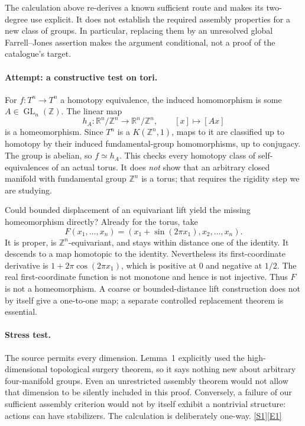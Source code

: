 \documentclass[11pt,a4paper]{article}
\newcommand{\Z}{\mathbb{Z}}
\newcommand{\R}{\mathbb{R}}
\newcommand{\sref}[2]{\hyperlink{source:#1:#2}{[S#2]}}
\newcommand{\eref}[2]{\hyperlink{extra:#1:#2}{[E#2]}}
\numberwithin{equation}{section}
\begin{document}
The calculation above re-derives a known sufficient route and makes its
two-degree use explicit. It does not establish the required assembly
properties for a new class of groups. In particular, replacing them by
an unresolved global Farrell--Jones assertion makes the argument
conditional, not a proof of the catalogue's target.

\paragraph{Attempt: a constructive test on tori.}
For $f:T^n\to T^n$ a homotopy equivalence, the induced homomorphism is
some $A\in\operatorname{GL}_n(\Z)$. The linear map
\[
 h_A:\R^n/\Z^n\longrightarrow\R^n/\Z^n,
 \qquad [x]\longmapsto[Ax]
\]
is a homeomorphism. Since $T^n$ is a $K(\Z^n,1)$, maps to it are
classified up to homotopy by their induced fundamental-group homomorphisms,
up to conjugacy. The group is abelian, so $f\simeq h_A$.
This checks every homotopy class of self-equivalences of an actual torus.
It does \emph{not} show that an arbitrary closed manifold with fundamental
group $\Z^n$ is a torus; that requires the rigidity step we are studying.

Could bounded displacement of an equivariant lift yield the missing
homeomorphism directly? Already for the torus, take
\[
 F(x_1,\ldots,x_n)=
 (x_1+\sin(2\pi x_1),x_2,\ldots,x_n).
\]
It is proper, is $\Z^n$-equivariant, and stays within distance one of the
identity. It descends to a map homotopic to the identity. Nevertheless its
first-coordinate derivative is $1+2\pi\cos(2\pi x_1)$, which is positive
at $0$ and negative at $1/2$. The real first-coordinate function is not
monotone and hence is not injective. Thus $F$ is not a homeomorphism.
A coarse or bounded-distance lift construction does not by itself give
a one-to-one map; a separate controlled replacement theorem is essential.

\paragraph{Stress test.}
The source permits every dimension. Lemma~1 explicitly used the
high-dimensional topological surgery theorem, so it says nothing new about
arbitrary four-manifold groups. Even an unrestricted assembly theorem
would not allow that dimension to be silently included in this proof.
Conversely, a failure of our sufficient assembly criterion would not by
itself exhibit a nontrivial structure: actions can have stabilizers.
The calculation is deliberately one-way. \sref{statement}{1}\eref{statement}{1}
\end{document}
